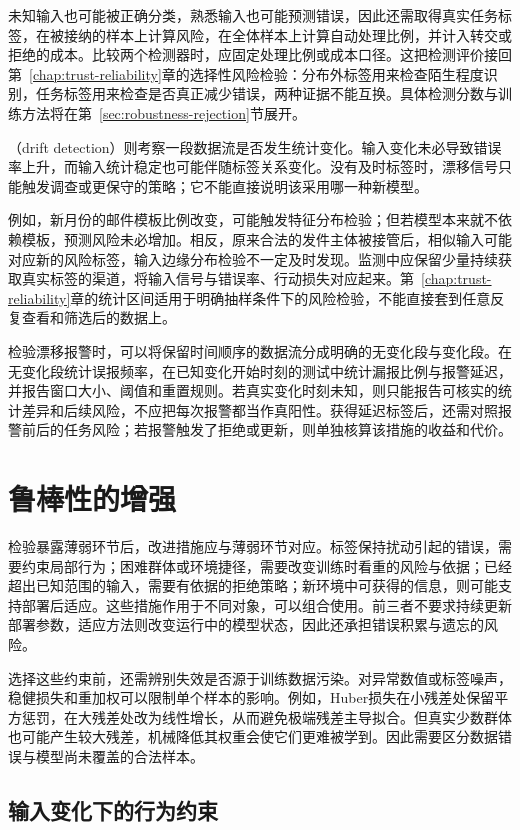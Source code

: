 未知输入也可能被正确分类，熟悉输入也可能预测错误，因此还需取得真实任务标签，在被接纳的样本上计算风险，在全体样本上计算自动处理比例，并计入转交或拒绝的成本。比较两个检测器时，应固定处理比例或成本口径。这把检测评价接回第~\ref{chap:trust-reliability}章的选择性风险检验：分布外标签用来检查陌生程度识别，任务标签用来检查是否真正减少错误，两种证据不能互换。具体检测分数与训练方法将在第~\ref{sec:robustness-rejection}节展开。

（drift detection）则考察一段数据流是否发生统计变化。输入变化未必导致错误率上升，而输入统计稳定也可能伴随标签关系变化。没有及时标签时，漂移信号只能触发调查或更保守的策略；它不能直接说明该采用哪一种新模型。

例如，新月份的邮件模板比例改变，可能触发特征分布检验；但若模型本来就不依赖模板，预测风险未必增加。相反，原来合法的发件主体被接管后，相似输入可能对应新的风险标签，输入边缘分布检验不一定及时发现。监测中应保留少量持续获取真实标签的渠道，将输入信号与错误率、行动损失对应起来。第~\ref{chap:trust-reliability}章的统计区间适用于明确抽样条件下的风险检验，不能直接套到任意反复查看和筛选后的数据上。

检验漂移报警时，可以将保留时间顺序的数据流分成明确的无变化段与变化段。在无变化段统计误报频率，在已知变化开始时刻的测试中统计漏报比例与报警延迟，并报告窗口大小、阈值和重置规则。若真实变化时刻未知，则只能报告可核实的统计差异和后续风险，不应把每次报警都当作真阳性。获得延迟标签后，还需对照报警前后的任务风险；若报警触发了拒绝或更新，则单独核算该措施的收益和代价。

\section{鲁棒性的增强}
\label{sec:robustness-enhancement}

检验暴露薄弱环节后，改进措施应与薄弱环节对应。标签保持扰动引起的错误，需要约束局部行为；困难群体或环境捷径，需要改变训练时看重的风险与依据；已经超出已知范围的输入，需要有依据的拒绝策略；新环境中可获得的信息，则可能支持部署后适应。这些措施作用于不同对象，可以组合使用。前三者不要求持续更新部署参数，适应方法则改变运行中的模型状态，因此还承担错误积累与遗忘的风险。

选择这些约束前，还需辨别失效是否源于训练数据污染。对异常数值或标签噪声，稳健损失和重加权可以限制单个样本的影响。例如，Huber损失在小残差处保留平方惩罚，在大残差处改为线性增长，从而避免极端残差主导拟合。但真实少数群体也可能产生较大残差，机械降低其权重会使它们更难被学到。因此需要区分数据错误与模型尚未覆盖的合法样本。

\subsection{输入变化下的行为约束}
\label{sec:robustness-local-enhancement}

